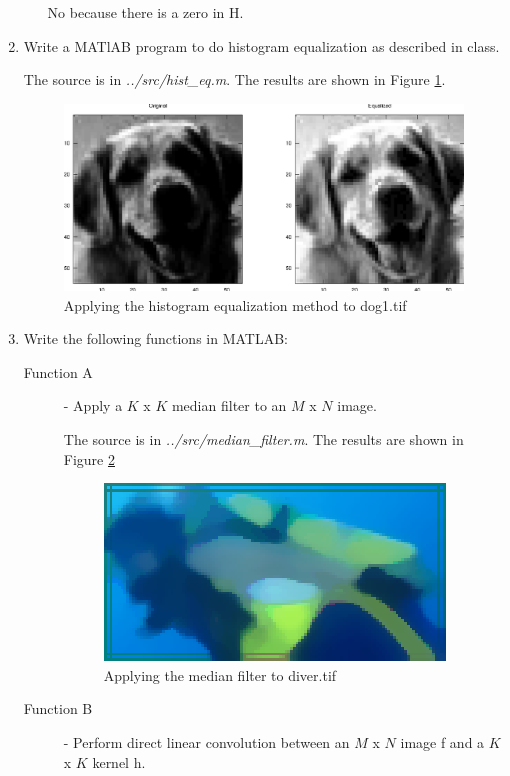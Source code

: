 \documentclass[10pt, a4paper]{article}
\begin{document}
\begin{enumerate}
\begin{enumerate}
        No because there is a zero in H.
    \end{enumerate}
    \pagebreak
  \item Write a MATlAB program to do histogram equalization as described in class.

    The source is in \textit{../src/hist\_eq.m}. The results are shown in Figure \ref{fig:4}.
    \begin{figure}[h!]
          \centering
          \includegraphics[]{../data/4.eps}
          \caption{Applying the histogram equalization method to dog1.tif}
          \label{fig:4}
    \end{figure}
  \item Write the following functions in MATLAB:
    \begin{description}
      \item[Function A] - Apply a $K$ x $K$ median filter to an $M$ x $N$ image.
        
        The source is in \textit{../src/median\_filter.m}. The results are shown in Figure \ref{fig:5a}
        \begin{figure}[h!]
          \centering
          \includegraphics[]{../data/5a.eps}
          \caption{Applying the median filter to diver.tif}
          \label{fig:5a}
        \end{figure}       
      \item[Function B] - Perform direct linear convolution between an $M$ x $N$ image f and
        a $K$ x $K$ kernel h.


\end{description}
\end{enumerate}
\end{document}
